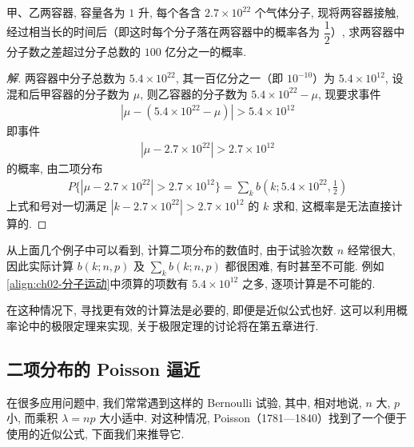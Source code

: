 \documentclass[../../main.tex]{subfiles}
\begin{document}
\begin{example}[分子运动]\label{example:ch02-分子运动}
甲、乙两容器, 容量各为 $1$ 升, 每个各含 $2.7\times 10^{22}$ 个气体分子, 现将两容器接触, 经过相当长的时间后（即这时每个分子落在两容器中的概率各为 $\dfrac{1}{2}$）, 求两容器中分子数之差超过分子总数的 $100$ 亿分之一的概率.

\begin{proof}[解]
两容器中分子总数为 $5.4\times 10^{22}$, 其一百亿分之一（即 $10^{-10}$）为 $5.4\times 10^{12}$, 设混和后甲容器的分子数为 $\mu$, 则乙容器的分子数为 $5.4\times 10^{22}-\mu$, 现要求事件
\begin{align*}
|\mu-(5.4\times 10^{22}-\mu)|>5.4\times 10^{12}
\end{align*}
即事件
\begin{align*}
|\mu-2.7\times 10^{22}|>2.7\times 10^{12}
\end{align*}
的概率, 由二项分布
\begin{align}\label{align:ch02-分子运动}
P\{|\mu-2.7\times 10^{22}|>2.7\times 10^{12}\}=\sum_k b\left(k;5.4\times 10^{22},\frac{1}{2}\right)
\end{align}
上式和号对一切满足 $|k-2.7\times 10^{22}|>2.7\times 10^{12}$ 的 $k$ 求和, 这概率是无法直接计算的.
\end{proof}

从上面几个例子中可以看到, 计算二项分布的数值时, 由于试验次数 $n$ 经常很大, 因此实际计算 $b(k;n,p)$ 及 $\sum_k b(k;n,p)$ 都很困难, 有时甚至不可能. 例如\eqref{align:ch02-分子运动}中须算的项数有 $5.4\times 10^{12}$ 之多, 逐项计算是不可能的.

在这种情况下, 寻找更有效的计算法是必要的, 即便是近似公式也好. 这可以利用概率论中的极限定理来实现, 关于极限定理的讨论将在第五章进行.
\end{example}

\subsection{二项分布的 Poisson 逼近}

在很多应用问题中, 我们常常遇到这样的 Bernoulli 试验, 其中, 相对地说, $n$ 大, $p$ 小, 而乘积 $\lambda=np$ 大小适中. 对这种情况, Poisson（1781—1840）找到了一个便于使用的近似公式, 下面我们来推导它.
\end{document}
